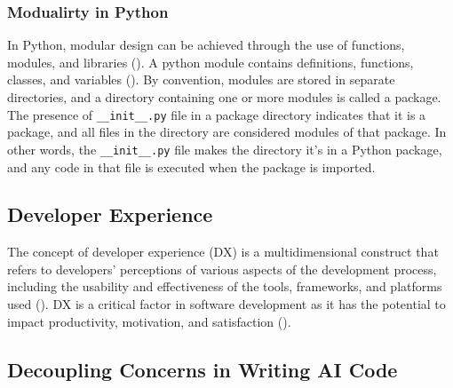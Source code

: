 \subsubsection{Modualirty in Python}
In Python, modular design can be achieved through the use of functions, modules, and libraries (\cite{sanner1999python}). 
A python module contains definitions, functions, classes, and variables (\cite{raschka2015python}). By convention, modules are stored in separate directories, and a directory containing one or more modules is called a package. The presence of \verb|__init__.py| file in a package directory indicates that it is a package, and all files in the directory are considered modules of that package. In other words, the \verb|__init__.py| file makes the directory it's in a Python package, and any code in that file is executed when the package is imported.



\subsection{Developer Experience}
The concept of developer experience (DX) is a multidimensional construct that refers to developers' perceptions of various aspects of the development process, including the usability and effectiveness of the tools, frameworks, and platforms used (\cite{fagerholm2012developer}). DX is a critical factor in software development as it has the potential to impact productivity, motivation, and satisfaction (\cite{fagerholm2012developer}).


\subsection{Decoupling Concerns in Writing AI Code}


